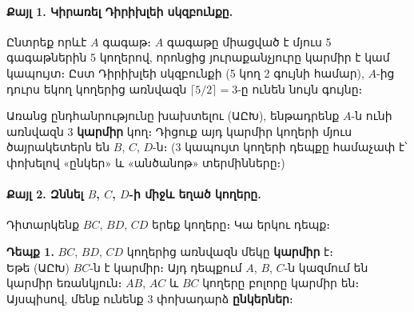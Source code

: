 \documentclass[12pt, a4paper]{article}
\begin{document}
\paragraph{Քայլ 1. Կիրառել Դիրիխլեի սկզբունքը.}
Ընտրեք որևէ $A$ գագաթ։ $A$ գագաթը միացված է մյուս 5 գագաթներին
5 կողերով, որոնցից յուրաքանչյուրը կարմիր է կամ կապույտ։
Ըստ Դիրիխլեի սկզբունքի (5 կող 2 գույնի համար),
$A$-ից դուրս եկող կողերից առնվազն $\lceil 5/2 \rceil = 3$-ը ունեն նույն գույնը։

Առանց ընդհանրությունը խախտելու (ԱԸԽ), ենթադրենք $A$-ն ունի առնվազն 3 \textbf{կարմիր}
կող։ Դիցուք այդ կարմիր կողերի մյուս ծայրակետերն են $B$, $C$, $D$-ն։
(3 կապույտ կողերի դեպքը համաչափ է՝ փոխելով «ընկեր» և «անծանոթ» տերմինները։)

\begin{center}
\end{center}

\paragraph{Քայլ 2. Զննել $B$, $C$, $D$-ի միջև եղած կողերը.}
Դիտարկենք $BC$, $BD$, $CD$ երեք կողերը։
Կա երկու դեպք։

\textbf{Դեպք 1.} $BC$, $BD$, $CD$ կողերից առնվազն մեկը \textbf{կարմիր} է։\\
Եթե (ԱԸԽ) $BC$-ն է կարմիր։ Այդ դեպքում $A$, $B$, $C$-ն կազմում են կարմիր եռանկյուն։
$AB$, $AC$ և $BC$ կողերը բոլորը կարմիր են։
Այսպիսով, մենք ունենք 3 փոխադարձ \textbf{ընկերներ}։
\end{document}
